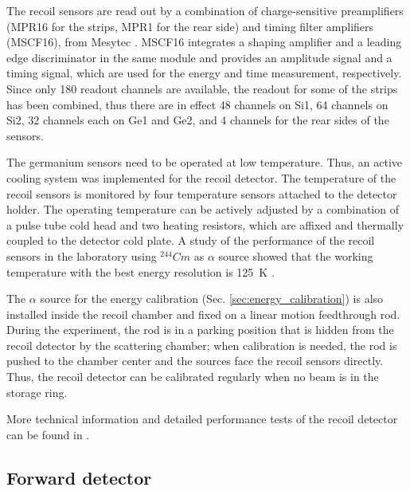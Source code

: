 \documentclass[number,5p]{elsarticle}
\begin{document}
The recoil sensors are read out by a combination of charge-sensitive preamplifiers (MPR16 for the strips, MPR1 for the rear side) and timing filter amplifiers (MSCF16), from Mesytec \cite{mesytec}. 
MSCF16 integrates a shaping amplifier and a leading edge discriminator in the
same module and provides an amplitude signal and a timing signal, which are used
for the energy and time measurement, respectively.
Since only 180 readout channels are available, the readout for some of the
strips has been combined, thus there are in effect 48 channels on Si1, 64
channels on Si2, 32 channels each on Ge1 and Ge2, and 4 channels for the rear sides
of the sensors. 

The germanium sensors need to be operated at low temperature.
Thus, an active cooling system was implemented for the recoil detector.
The temperature of the recoil sensors is monitored by four temperature sensors attached to the detector holder.
The operating temperature can be actively adjusted by a combination of a pulse
tube cold head \cite{pt30} and two heating resistors, which are affixed and thermally coupled to the detector cold plate.
A study of the performance of the recoil sensors in the laboratory using
$^{244}Cm$ as $\alpha$ source showed that the working temperature with the best energy resolution is
\SI{125}{\kelvin} \cite{recoil_article}.

The $\alpha$ source for the energy calibration (Sec. \ref{sec:energy_calibration}) is also installed inside the recoil chamber and fixed on a linear motion feedthrough rod.
During the experiment, the rod is in a parking position that is hidden from the
recoil detector by the scattering chamber;
when calibration is needed, the rod is pushed to the chamber center and the sources face the recoil sensors directly.
Thus, the recoil detector can be calibrated regularly when no beam is in the storage ring.

More technical information and detailed performance tests of the recoil detector can be found in \cite{recoil_article}.

\subsection{Forward detector}
\label{sec:fwd}
\end{document}
